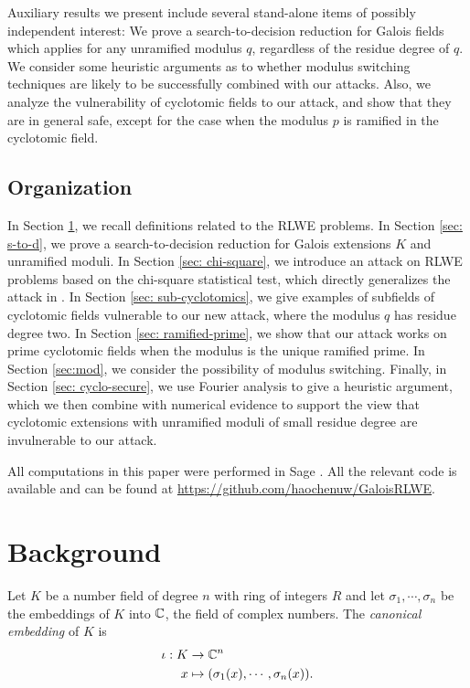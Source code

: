 \documentclass[envcountsame]{llncs}
\begin{document}
 Auxiliary results we present include several stand-alone items of possibly independent interest:
 We prove a search-to-decision reduction  for Galois fields which applies for any unramified modulus $q$, regardless of the residue degree of $q$.  We consider some heuristic arguments as to whether modulus switching techniques are likely to be successfully combined with our attacks.
Also, we analyze the vulnerability of cyclotomic fields to our attack, and show that they are in general safe, except for the case when the modulus $p$ is ramified in the cyclotomic field.


\subsection{Organization}

In Section \ref{sec: background}, we recall definitions related to the RLWE problems. In Section \ref{sec: s-to-d}, we prove a search-to-decision reduction for Galois extensions $K$ and unramified moduli. In Section \ref{sec: chi-square}, we introduce an attack on RLWE problems based on the chi-square statistical test, which directly generalizes the attack in \cite{elos2015weak}.
In Section \ref{sec: sub-cyclotomics}, we give examples of subfields of cyclotomic fields vulnerable to our new attack, where the modulus $q$ has residue degree two.
In Section \ref{sec: ramified-prime}, we show that our attack works on prime cyclotomic fields when the modulus is the unique ramified prime.  In Section \ref{sec:mod}, we consider the possibility of modulus switching.  Finally, in Section \ref{sec: cyclo-secure}, we use Fourier analysis to give a heuristic argument, which we then combine with numerical evidence to support the view that cyclotomic extensions with unramified moduli of small residue degree are invulnerable to our attack.

All computations in this paper were performed in Sage \cite{sage}. All the relevant code is available and  can be found at \url{https://github.com/haochenuw/GaloisRLWE}.


\section{Background} \label{sec: background}

Let $K$ be a number field of degree $n$ with ring of integers $R$ and let $\sigma_1, \cdots, \sigma_n$ be the embeddings of $K$ into $\mathbb{C}$, the field of complex numbers. The {\it canonical embedding} of $K$ is
\begin{align*}
    \iota: K &\to \mathbb{C}^n \\
     x & \mapsto (\sigma_1(x), \cdots, \sigma_n(x)).
\end{align*}
\end{document}
